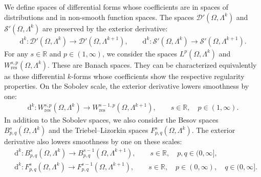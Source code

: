 \documentclass[10pt,a4paper]{amsart}
\theoremstyle{definition}
\theoremstyle{remark}
\numberwithin{equation}{section}
\newcommand{\bbR}{{\mathbb R}}
\newcommand{\calD}{{\mathcal D}}
\newcommand{\calS}{{\mathcal S}}
\newcommand{\cartan}{{\mathrm d}}
\newcommand{\Domain}{{\Omega}}
\newcommand{\Alt}[1]{\Lambda^{#1}}
\newcommand{\Wres}{W_{\mathrm{res}}}
\begin{document}
We define spaces of differential forms whose coefficients are in spaces of distributions and in non-smooth function spaces. 
The spaces $\calD'(\Domain,\Alt{k})$ and $\calS'(\Domain,\Alt{k})$ are preserved by the exterior derivative:
\begin{align*}
    \cartan^{k} : \calD'(\Domain,\Alt{k}) \to \calD'(\Domain,\Alt{k+1}), \qquad \cartan^{k} : \calS'(\Domain,\Alt{k}) \to \calS'(\Domain,\Alt{k+1}).
\end{align*}
For any $s \in \bbR$ and $p \in (1,\infty)$, 
we consider the spaces $L^{p}(\Domain,\Alt{k})$ and $\Wres^{s,p}(\Domain,\Alt{k})$.
These are Banach spaces. 
They can be characterized equivalently as those differential $k$-forms whose coefficients show the respective regularity properties. 
On the Sobolev scale, the exterior derivative lowers smoothness by one:
\begin{align*}
    \cartan^{k} : \Wres^{s,p}(\Domain,\Alt{k}) \to \Wres^{s-1,p}(\Domain,\Alt{k+1}), \qquad s \in \bbR, \quad p \in (1,\infty)
    .
\end{align*}
In addition to the Sobolev spaces, we also consider the Besov spaces $B^{s}_{p,q}(\Domain,\Alt{k})$ and the Triebel--Lizorkin spaces $F^{s}_{p,q}(\Domain,\Alt{k})$.
The exterior derivative also lowers smoothness by one on these scales:
\begin{align*}
    &
    \cartan^{k} : B^{s}_{p,q}(\Domain,\Alt{k}) \to B^{s-1}_{p,q}(\Domain,\Alt{k+1}), \qquad s \in \bbR, \quad p,q \in (0,\infty]
    ,
    \\
    &
    \cartan^{k} : F^{s}_{p,q}(\Domain,\Alt{k}) \to F^{s-1}_{p,q}(\Domain,\Alt{k+1}), \qquad s \in \bbR, \quad p \in (0,\infty), \quad q \in (0,\infty]
    .
\end{align*}
\end{document}
